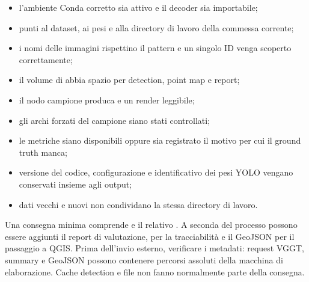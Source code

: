 \begin{itemize}
  \item l'ambiente Conda corretto sia attivo e il decoder sia importabile;
  \item {} punti al dataset, ai pesi e alla directory di lavoro
        della commessa corrente;
  \item i nomi delle immagini rispettino il pattern e un singolo ID venga
        scoperto correttamente;
  \item il volume di  abbia spazio per detection, point map e
        report;
  \item il nodo campione produca  e un render
        leggibile;
  \item gli archi forzati del campione siano stati controllati;
  \item le metriche siano disponibili oppure sia registrato il motivo per cui
        il ground truth manca;
  \item versione del codice, configurazione e identificativo dei pesi YOLO
        vengano conservati insieme agli output;
  \item dati vecchi e nuovi non condividano la stessa directory di lavoro.
\end{itemize}

Una consegna minima comprende  e il relativo
. A seconda del processo possono essere aggiunti
il report di valutazione,  per la tracciabilità e il
GeoJSON per il passaggio a QGIS. Prima dell'invio esterno, verificare i
metadati: request VGGT, summary e GeoJSON possono contenere percorsi assoluti
della macchina di elaborazione. Cache detection e file  non fanno
normalmente parte della consegna.
